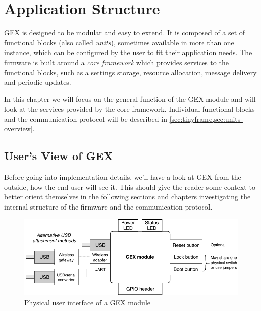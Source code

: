 \chapter{Application Structure}

GEX is designed to be modular and easy to extend. It is composed of a set of functional blocks (also called \textit{units}), sometimes available in more than one instance, which can be configured by the user to fit their application needs. The firmware is built around a \textit{core framework} which provides services to the functional blocks, such as a settings storage, resource allocation, message delivery and periodic updates.

In this chapter we will focus on the general function of the GEX module and will look at the services provided by the core framework. Individual functional blocks and the communication protocol will be described in \cref{sec:tinyframe,sec:units-overview}.

\section{User's View of GEX}

Before going into implementation details, we'll have a look at GEX from the outside, how the end user will see it. This should give the reader some context to better orient themselves in the following sections and chapters investigating the internal structure of the firmware and the communication protocol.

\begin{figure}[h]
	\centering
	\includegraphics[scale=.95] {img/users-view.pdf}
	\caption{\label{fig:users-view-of-gex}Physical user interface of a GEX module}
\end{figure}

